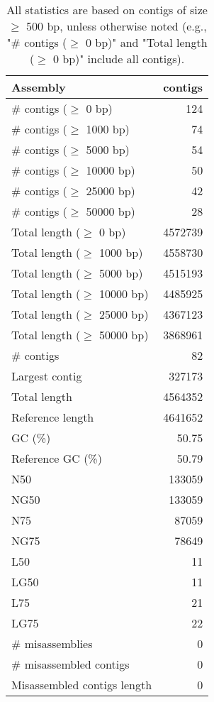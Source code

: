\documentclass[12pt,a4paper]{article}
\begin{document}
\begin{table}[ht]
\begin{center}
\caption{All statistics are based on contigs of size $\geq$ 500 bp, unless otherwise noted (e.g., "\# contigs ($\geq$ 0 bp)" and "Total length ($\geq$ 0 bp)" include all contigs).}
\begin{tabular}{|l*{1}{|r}|}
\hline
Assembly & contigs \\ \hline
\# contigs ($\geq$ 0 bp) & 124 \\ \hline
\# contigs ($\geq$ 1000 bp) & 74 \\ \hline
\# contigs ($\geq$ 5000 bp) & 54 \\ \hline
\# contigs ($\geq$ 10000 bp) & 50 \\ \hline
\# contigs ($\geq$ 25000 bp) & 42 \\ \hline
\# contigs ($\geq$ 50000 bp) & 28 \\ \hline
Total length ($\geq$ 0 bp) & 4572739 \\ \hline
Total length ($\geq$ 1000 bp) & 4558730 \\ \hline
Total length ($\geq$ 5000 bp) & 4515193 \\ \hline
Total length ($\geq$ 10000 bp) & 4485925 \\ \hline
Total length ($\geq$ 25000 bp) & 4367123 \\ \hline
Total length ($\geq$ 50000 bp) & 3868961 \\ \hline
\# contigs & 82 \\ \hline
Largest contig & 327173 \\ \hline
Total length & 4564352 \\ \hline
Reference length & 4641652 \\ \hline
GC (\%) & 50.75 \\ \hline
Reference GC (\%) & 50.79 \\ \hline
N50 & 133059 \\ \hline
NG50 & 133059 \\ \hline
N75 & 87059 \\ \hline
NG75 & 78649 \\ \hline
L50 & 11 \\ \hline
LG50 & 11 \\ \hline
L75 & 21 \\ \hline
LG75 & 22 \\ \hline
\# misassemblies & 0 \\ \hline
\# misassembled contigs & 0 \\ \hline
Misassembled contigs length & 0 \\ \hline

\end{tabular}
\end{center}
\end{table}
\end{document}
